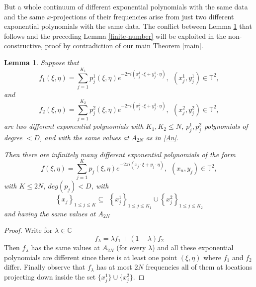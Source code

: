 \documentclass[12pt,a4paper,oneside]{amsart}
\newtheorem{lemma}{Lemma}[section]
\theoremstyle{definition}
\newcommand{\Set}[1]{{\left\{{#1}\right\}}}
\newcommand{\CC}{{\mathbb C}}
\newcommand{\TT}{{\mathbb T}}
\newcommand{\red}[1]{{#1}}
\newcounter{rem}
\begin{document}
But a whole continuum of different exponential polynomials with the same data and the same $x$-projections of their frequencies arise from just two different exponential polynomials with the same data. \red{The conflict between Lemma \ref{infinite-number} that follows and the preceding Lemma \ref{finite-number} will be exploited in the non-constructive, proof by contradiction of our main Theorem \ref{main}.}

\begin{lemma}\label{infinite-number}
Suppose that
\begin{equation*}
f_1(\xi,\eta )= \sum_{j=1}^{K_1} p_j ^1 (\xi,\eta) e^{-2\pi i (x_j ^1 \cdot \xi + y_j ^1 \cdot \eta )}\red{,\ \ (x_j^1, y_j^1) \in \TT^2,}
\end{equation*}
and
\begin{equation*}
	f_2(\xi,\eta)= \sum_{j=1}^{K_2} p_j ^2 (\xi,\eta) e^{-2\pi i (x_j ^2 \cdot \xi + y_j ^2 \cdot \eta )}\red{,\ \ (x_j^2, y_j^2) \in \TT^2,}
\end{equation*}
are two different exponential polynomials with $K_1,K_2\le N$, $p_j ^1,p_j ^2$ polynomials of degree $< D$, and with the same values at $A_{2N}$ as in \eqref{An}.

Then there are infinitely many different exponential polynomials of the form
\begin{equation*}
f(\xi,\eta) = \sum_{j=1}^K p_j (\xi,\eta) e^{-2\pi i (x_j \cdot \xi + y_j \cdot \eta )}\red{,\ \ (x_n, y_j) \in \TT^2,}
\end{equation*}
with $K\le 2N$, $deg(p_j) < D$, with
\begin{equation*}
\Set{x_j}_{1 \le j \le K} \subseteq \ \ \Set{x_j ^1}_{1\le j \le K_1} \cup \Set{x_j ^2}_{1\le j \le K_2}
\end{equation*}
and having the same values at $A_{2N}$
\end{lemma}
\begin{proof}
Write for $\lambda \in \CC$
\begin{equation*}
	f_\lambda = \lambda f_1 +(1-\lambda)f_2
\end{equation*}
Then $f_\lambda$ has the same values at $A_{2N}$ (for every $\lambda$) and all these exponential polynomials are different \red{since} there is at least one point \red{$(\xi, \eta)$} where $f_1$ and $f_2$ differ. Finally observe that $f_\lambda$ has at most $2N$ frequencies all of them at locations projecting down inside the set $\{x_j^1\}\cup \{x_j ^2\}$.

\end{proof}
\end{document}
